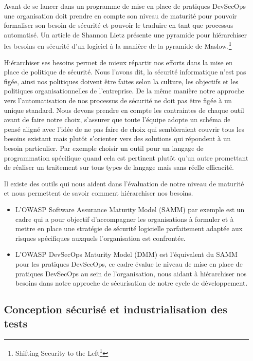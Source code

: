 \documentclass[
  11pt,
  a4paper,
  krantz2,
  11pt,
  oneside]{krantz}
\renewcommand{\href}[2]{#2\footnote{\url{#1}}}
\begin{document}
Avant de se lancer dans un programme de mise en place de pratiques DevSecOps une organisation doit prendre en compte son niveau de maturité pour pouvoir formaliser son besoin de sécurité et pouvoir le traduire en tant que processus automatisé. Un article de Shannon Lietz présente une pyramide pour hiérarchiser les besoins en sécurité d'un logiciel à la manière de la pyramide de Maslow.\footnote{\href{https://www.devsecops.org/blog/2016/5/20/-security}{Shifting Security to the Left}}

Hiérarchiser ses besoins permet de mieux répartir nos efforts dans la mise en place de politique de sécurité. Nous l'avons dit, la sécurité informatique n'est pas figée, ainsi nos politiques doivent être faites selon la culture, les objectifs et les politiques organisationnelles de l'entreprise. De la même manière notre approche vers l'automatisation de nos processus de sécurité ne doit pas être figée à un unique standard. Nous devons prendre en compte les contraintes de chaque outil avant de faire notre choix, s'assurer que toute l'équipe adopte un schéma de pensé aligné avec l'idée de ne pas faire de choix qui sembleraient couvrir tous les besoins existant mais plutôt s'orienter vers des solutions qui répondent à un besoin particulier. Par exemple choisir un outil pour un langage de programmation spécifique quand cela est pertinent plutôt qu'un autre promettant de réaliser un traitement sur tous types de langage mais sans réelle efficacité.

Il existe des outils qui nous aident dans l'évaluation de notre niveau de maturité et nous permettent de savoir comment hiérarchiser nos besoins.

\begin{itemize}
\item
  L'OWASP Software Assurance Maturity Model (SAMM) par exemple est un cadre qui a pour objectif d'accompagner les organisations à formuler et à mettre en place une stratégie de sécurité logicielle parfaitement adaptée aux risques spécifiques auxquels l'organisation est confrontée.
\item
  L'OWASP DevSecOps Maturity Model (DMM) est l'équivalent du SAMM pour les pratiques DevSecOps, ce cadre évalue le niveau de mise en place de pratiques DevSecOps au sein de l'organisation, nous aidant à hiérarchiser nos besoins dans notre approche de sécurisation de notre cycle de développement.
\end{itemize}

\subsection{Conception sécurisé et industrialisation des tests}\label{conception-suxe9curisuxe9-et-industrialisation-des-tests}
\end{document}
